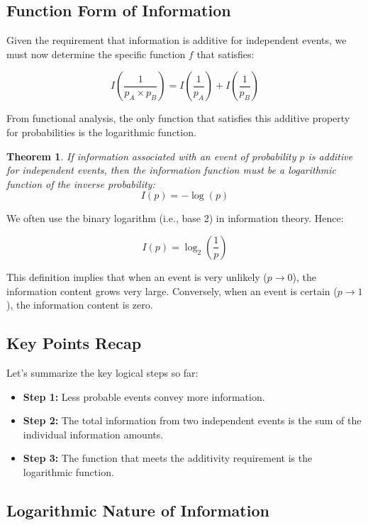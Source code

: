 \documentclass[12pt,a4paper]{article}
\newtheorem{theorem}{Theorem}[section]
\newenvironment{thmbox}[1][]{%
  \begin{tcolorbox}[enhanced, breakable, colback=thmcolor, colframe=blue!50!black, title=#1, fonttitle=\bfseries, arc=3pt, boxrule=0.5pt]
}{\end{tcolorbox}}
\begin{document}
\subsection{Function Form of Information}
Given the requirement that information is additive for independent events, we must now determine the specific function $f$ that satisfies:

\[
I\left(\frac{1}{p_A \times p_B}\right) = I\left(\frac{1}{p_A}\right) + I\left(\frac{1}{p_B}\right)
\]

From functional analysis, the only function that satisfies this additive property for probabilities is the logarithmic function. 

\begin{thmbox}[Information as Logarithm of Inverse Probability]
\begin{theorem}
If information associated with an event of probability $p$ is additive for independent events, then the information function must be a logarithmic function of the inverse probability:
\[
I(p) = - \log(p)
\]
\end{theorem}
\end{thmbox}

We often use the binary logarithm (i.e., base 2) in information theory. Hence:

\[
I(p) = \log_2\left(\frac{1}{p}\right)
\]

This definition implies that when an event is very unlikely ($p \to 0$), the information content grows very large. Conversely, when an event is certain ($p \to 1$), the information content is zero.

\subsection{Key Points Recap}
Let’s summarize the key logical steps so far:

\begin{itemize}
    \item \textbf{Step 1:} Less probable events convey more information.
    \item \textbf{Step 2:} The total information from two independent events is the sum of the individual information amounts.
    \item \textbf{Step 3:} The function that meets the additivity requirement is the logarithmic function.
\end{itemize}

\subsection{Logarithmic Nature of Information}
\end{document}
